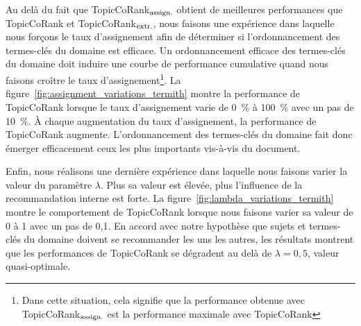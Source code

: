         Au delà du fait que TopicCoRank$_\textnormal{assign.}$ obtient de
        meilleures performances que TopicCoRank et
        TopicCoRank$_\textnormal{extr.}$, nous faisons une expérience dans
        laquelle nous forçons le taux d'assignement afin de déterminer si
        l'ordonnancement des termes-clés du domaine est efficace.
        Un ordonnancement efficace des termes-clés du domaine doit induire une
        courbe de performance cumulative quand nous faisons croître le taux
        d'assignement\footnote{Dans cette situation, cela signifie que la
        performance obtenue avec TopicCoRank$_\textnormal{assign.}$ est la
        performance maximale avec TopicCoRank}. La
        figure~\ref{fig:assignment_variations_termith} montre la performance de
        TopicCoRank lorsque le taux d'assignement varie de 0~\% à 100~\% avec un
        pas de 10~\%. À chaque augmentation du taux d'assignement, la
        performance de TopicCoRank augmente. L'ordonnancement des termes-clés du
        domaine fait donc émerger efficacement ceux les plus
        importants vis-à-vis du document.
        

        Enfin, nous réalisons une dernière expérience dans laquelle nous faisons
        varier la valeur du paramètre $\lambda$. Plus sa valeur est élevée, plus
        l'influence de la recommandation interne est forte. La
        figure~\ref{fig:lambda_variations_termith} montre le comportement de
        TopicCoRank lorsque nous faisons varier sa valeur de 0 à 1
        avec un pas de 0,1. En accord avec notre hypothèse que sujets et
        termes-clés du domaine doivent se recommander les uns les autres, les
        résultats montrent que les performances de TopicCoRank se dégradent au
        delà de $\lambda = 0,5$, valeur quasi-optimale.
        
      
